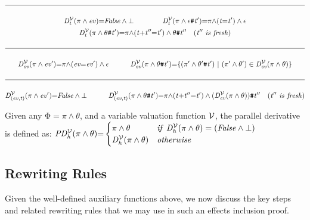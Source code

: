 \documentclass[acmsmall,10pt,review]{acmart}
\newcommand{\env}{\code{\mathcal{V}}}
\newcommand{\es}{\theta}
\newcommand{\ev}{ev}
\newcommand{\effect}{{\ensuremath{\mathrm{\Phi}}}}
\newcommand{\code}[1]{{\tt{\ensuremath{\m{#1}}}}}
\newcommand{\bott}{\textcolor{black}{\ensuremath{\bot}}}
\newcommand{\m}{\mathit}
\newcommand{\mysharp}{{\mathrel{\texttt{\#}}}}
\begin{document}
{\begin{definition}
\begin{gather*}
 \hline
 ~\\
 \code{D^{\env}_{t}(\pi \wedge  \ev) } {=} \code{False \wedge \bott} 
 \qquad\qquad 
 \code{D^{\env}_{t}(\pi \wedge  \epsilon \mysharp t^\prime) } {=}  
 \code{\pi{\wedge}(t{=}t^\prime) \wedge \epsilon}
 \\
 \code{D^{\env}_{t}(\pi \wedge  \es \mysharp t^\prime) } {=} 
 \code{\pi{\wedge}(t{+}t^{\prime\prime}{=}t^\prime) \wedge  
 \es \mysharp t^{\prime\prime} \ \ \  {(t^{\prime\prime}\ is\ fresh)} } 
\\~\\
\hline
~\\
\code{D^{\env}_{\ev}(\pi \wedge  \ev^\prime) } {=} 
\code{\pi{\wedge}(\ev{=}\ev^\prime) \wedge \epsilon} 
\qquad \quad 
\code{D^{\env}_{\ev}(\pi \wedge  \es \mysharp t^\prime) } {=} 
\code{\{(\pi^\prime \wedge \es^\prime \mysharp t^\prime) \ | \ (\pi^\prime \wedge \es^\prime) \in D^{\env}_{\ev}(\pi \wedge  \es)\}} 
\\~\\
\hline
~\\
\code{D^{\env}_{(\ev, t)}(\pi \wedge  \ev^\prime) } {=} 
\code{False \wedge \bott}  
\qquad \ \ \  
\code{D^{\env}_{(\ev, t)}(\pi \wedge  \es \mysharp t^\prime) } {=} 
\code{\pi{\wedge}(t{+}t^{\prime\prime}{=}t^\prime) \wedge  
(D^{\env}_{\ev}(\pi \wedge  \es)) \mysharp t^{\prime\prime} \ \ \  {(t^{\prime\prime}\ is\ fresh)}} 
\\
\end{gather*}
\end{definition}


\begin{definition}\label{Derivative_maybe}
  Given any \code{\effect {=} \pi \wedge \es}, and a variable valuation function \code{\env}, 
  the parallel derivative is defined as: {
    \code{PD^{\env}_{h}(\pi \wedge \es) {=}
    \begin{cases}
          \code{\pi \wedge \es} & \code{if\ D^{\env}_{h}(\pi \wedge \es) = (False \wedge \bott)}\\
          \code{D^{\env}_{h}(\pi \wedge \es)} & \code{otherwise}
        \end{cases} }
        }


  
\end{definition}

\subsection{Rewriting Rules}
\label{InferenceRules}
Given the well-defined auxiliary functions above, we now discuss the key steps and related rewriting rules that we may use in such an effects inclusion proof.  


}
\end{document}
